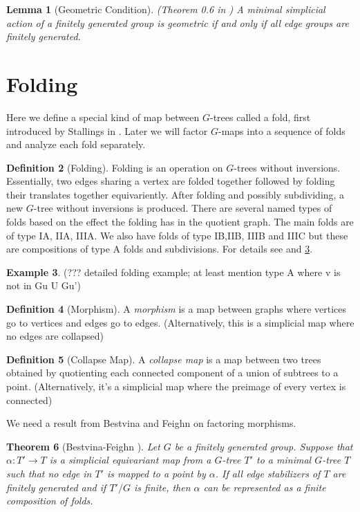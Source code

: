 \documentclass[12pt,parskip=full]{report}
\theoremstyle{plain}
\newtheorem{thm}{Theorem}[section]
\newtheorem{lem}[thm]{Lemma}
\theoremstyle{definition}
\newtheorem{dfn}[thm]{Definition}
\newtheorem{exa}[thm]{Example}
\begin{document}
\begin{lem}
    [Geometric Condition]
    \label{lem:simpgeo} 
    (Theorem 0.6 in \cite{levitt})
    A minimal simplicial action of a finitely generated group is geometric if and only if all edge groups are finitely generated.
\end{lem}

\section{Folding} 

Here we define a special kind of map between \(G\)-trees called a fold, first introduced by Stallings in \cite{stallingsfolds}. Later we will factor \(G\)-maps into a sequence of folds and analyze each fold separately.

\begin{dfn}
    [Folding]
    \label{defn:folding}
    Folding is an operation on \(G\)-trees without inversions. Essentially, two edges sharing a vertex are folded together followed by folding their translates together equivariently. After folding and possibly subdividing, a new \(G\)-tree without inversions is produced. There are several named types of folds based on the effect the folding has in the quotient graph. The main folds are of type IA, IIA, IIIA. We also have folds of type IB,IIB, IIIB and IIIC but these are compositions of type A folds and subdivisions. For details see \cite{boundingcomplexity} and \ref{exa:folding}.
\end{dfn}

\begin{exa}
\label{exa:folding}
(??? detailed folding example; at least mention type A where v is not in Gu U Gu')
\end{exa}

\begin{dfn}
    [Morphism]
    A \emph{morphism} is a map between graphs where vertices go to vertices and edges go to edges. (Alternatively, this is a simplicial map where no edges are collapsed)
\end{dfn}

\begin{dfn}
    [Collapse Map]
    A \emph{collapse map} is a map between two trees obtained by quotienting each connected component of a union of subtrees to a point. (Alternatively, it's a simplicial map where the preimage of every vertex is connected)
\end{dfn}

We need a result from Bestvina and Feighn on factoring morphisms.
\begin{thm}[Bestvina-Feighn \cite{boundingcomplexity}]
    \label{thm:folds} 
    Let $G$ be a finitely generated group. Suppose that $\alpha: T'\to T$ is a simplicial equivariant map from a $G$-tree $T'$ to a minimal $G$-tree $T$ such that no edge in $T'$ is mapped to a point by $\alpha$. If all edge stabilizers of $T$ are finitely generated and if $T'/G$ is finite, then $\alpha$ can be represented as a finite composition of folds.
\end{thm}
\end{document}
